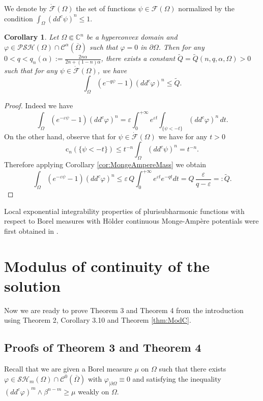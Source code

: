 \documentclass[12pt]{amsart}
\newtheorem{corollary}[theorem]{Corollary}
\theoremstyle{definition}
\numberwithin{theorem}{section}
\numberwithin{equation}{section}
\newcommand{\C}{\mathbb{C}}
\begin{document}
{ We denote by  $\dot{\mathcal{F}} (\Omega)$ the set of functions $\psi \in \mathcal{F} (\Omega)$ normalized by the condition $\int_\Omega (dd^c \psi)^n \leq 1$.
\begin{corollary}  Let $\Omega \Subset \C^n$ be a hyperconvex  domain and $\varphi\in \mathcal{PSH} (\Omega)\cap \mathcal{C}^{\alpha} (\overline\Omega)$ such that $\varphi = 0$ in $\partial \Omega$.   Then   for any $0 < q < q_n (\alpha) := \frac{ 2 n \alpha}{   2n + (1- n) \alpha  }$, there exists a constant $ \tilde Q = \tilde Q (n,q,\alpha,\Omega)>0$ such that for  any  $\psi \in \dot{\mathcal{F}} (\Omega)$, we have
 $$
 \int_\Omega \left(e^{-q \psi} - 1\right) (dd^c \varphi)^n \leq  \tilde  Q.
 $$
\end{corollary} 
\begin{proof}  Indeed we have
$$
\int_\Omega\left(e^{-\varepsilon \psi} - 1\right) (dd^c \varphi)^n = \varepsilon \int_0^{+\infty} e^{\varepsilon t} \int_{ \{\psi < - t\}} (dd^c \varphi)^n \, d t.
$$
On the other hand, observe that for $\psi \in \dot{\mathcal{F}} (\Omega)$ we have for any $t > 0$
$$\text{c}_n  ( \{\psi < - t\}) \leq t^{- n} \int_\Omega (dd^c \psi)^n = t^{- n}.
$$ 
 Therefore applying Corollary \ref{cor:MongeAmpereMass} we obtain
$$
\int_ \Omega \left(e^{-\varepsilon \psi} - 1\right)  (dd^c \varphi)^n \leq  \varepsilon \,  Q \int_0^{+\infty} e^{\varepsilon t} e^{- q t} d t = Q \, \frac{\varepsilon}{q -\varepsilon} =: \tilde Q.
$$
\end{proof}
Local exponential integrability properties of plurisubharmonic functions with respect to
Borel measures with  H\"older continuous Monge-Amp\`ere potentials were first obtained in \cite{DNS10}.
\section{ Modulus of continuity of the solution}

Now we are ready to prove Theorem 3 and Theorem 4 from the introduction using Theorem 2, Corollary 3.10  and Theorem \ref{thm:ModC}.


\subsection{Proofs of Theorem 3 and Theorem 4}
Recall that we are given  a Borel measure $\mu$ on $\Omega$ such that there exists $\varphi\in \mathcal{SH}_m(\Omega)\cap\mathcal{C}^{0}(\overline\Omega)$ with $\varphi_{\mid \partial \Omega} \equiv 0$ and satisfying the inequality  $ (dd^c\varphi)^m\wedge\beta^{n-m} \geq \mu$ weakly on $\Omega$. 

}
\end{document}
